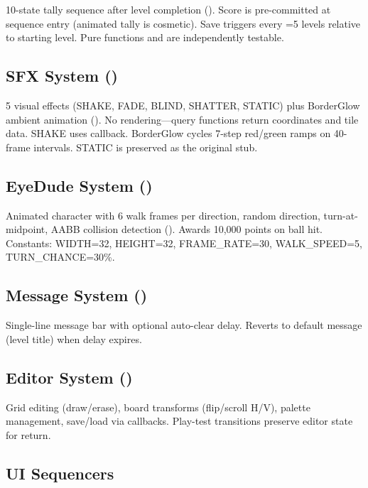 \documentclass[11pt,a4paper]{article}
\begin{document}
10-state tally sequence after level completion (). Score is pre-committed at sequence entry (animated tally is cosmetic). Save triggers every =5 levels relative to starting level. Pure functions  and  are independently testable.

\subsection{SFX System ()}
\label{sec:sfx-system}

5 visual effects (SHAKE, FADE, BLIND, SHATTER, STATIC) plus BorderGlow ambient animation (). No rendering---query functions return coordinates and tile data. SHAKE uses  callback. BorderGlow cycles 7-step red/green ramps on 40-frame intervals. STATIC is preserved as the original stub.

\subsection{EyeDude System ()}
\label{sec:eyedude-system}

Animated character with 6 walk frames per direction, random direction, turn-at-midpoint, AABB collision detection (). Awards 10{,}000 points on ball hit. Constants: WIDTH=32, HEIGHT=32, FRAME\_RATE=30, WALK\_SPEED=5, TURN\_CHANCE=30\%.

\subsection{Message System ()}
\label{sec:message-system}

Single-line message bar with optional auto-clear delay. Reverts to default message (level title) when delay expires.

\subsection{Editor System ()}
\label{sec:editor-system}

Grid editing (draw/erase), board transforms (flip/scroll H/V), palette management, save/load via callbacks. Play-test transitions preserve editor state for return.

\subsection{UI Sequencers}
\label{sec:ui-sequencers}
\end{document}
